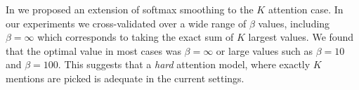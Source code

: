 

In  we proposed an extension of softmax smoothing to the $K$ attention case. In our experiments 
we cross-validated over a wide range of $\beta$ values, including $\beta=\infty$ which corresponds to taking
the exact sum of $K$ largest values. We found that the optimal value in most cases was  $\beta=\infty$ or large values
such as $\beta=10$ and $\beta=100$. This suggests that a {\em hard} attention model, where exactly $K$ mentions are picked is adequate in the current settings.



%
%



